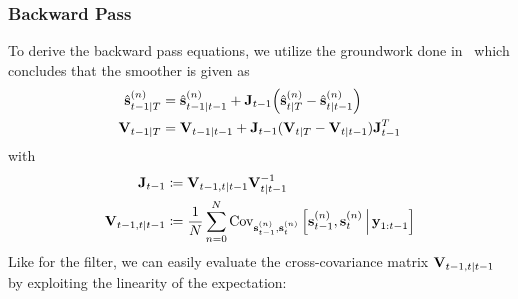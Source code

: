 	\subsubsection{Backward Pass}
		To derive the backward pass equations, we utilize the groundwork done in~\cite{deisenrothProbabilisticPerspectiveGaussian2011} which concludes that the smoother is given as
		\begin{align*}
			\hat{\boldsymbol{\mathrm{s}}}_{t - 1 \vert T}^{(n)} & = \hat{\boldsymbol{\mathrm{s}}}_{t - 1 \vert t - 1}^{(n)} + \boldsymbol{\mathrm{J}}_{t - 1} \Big(\hat{\boldsymbol{\mathrm{s}}}_{t \vert T}^{(n)} - \hat{\boldsymbol{\mathrm{s}}}_{t \vert t - 1}^{(n)}\Big) \\
			\boldsymbol{\mathrm{V}}_{t - 1 \vert T}             & = \boldsymbol{\mathrm{V}}_{t - 1 \vert t - 1} + \boldsymbol{\mathrm{J}}_{t - 1} (\boldsymbol{\mathrm{V}}_{t \vert T} - \boldsymbol{\mathrm{V}}_{t \vert t - 1}) \boldsymbol{\mathrm{J}}_{t - 1}^T
		\end{align*}
		with
		\begin{align}
			\boldsymbol{\mathrm{J}}_{t - 1}                    &\coloneqq \boldsymbol{\mathrm{V}}_{t - 1, t \vert t - 1} \boldsymbol{\mathrm{V}}_{t \vert t - 1}^{-1}  \nonumber \\
			\boldsymbol{\mathrm{V}}_{t - 1, t \vert t - 1} &\coloneqq \frac{1}{N} \sum_{n = 0}^{N} \operatorname{Cov}_{\boldsymbol{\mathrm{s}}_{t - 1}^{(n)}, \boldsymbol{\mathrm{s}}_t^{(n)}}\Big[\boldsymbol{\mathrm{s}}_{t - 1}^{(n)}, \boldsymbol{\mathrm{s}}_t^{(n)} \,\Big\vert\, \boldsymbol{\mathrm{y}}_{1:t - 1}\Big]  \label{eq:smootherPriorCrossCov}
		\end{align}
		Like for the filter, we can easily evaluate the cross-covariance matrix \( \boldsymbol{\mathrm{V}}_{t - 1, t \vert t - 1} \) by exploiting the linearity of the expectation:
